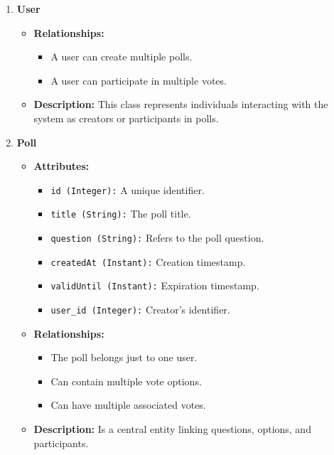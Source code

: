 \begin{enumerate}
    \item \textbf{User}
    \begin{itemize}
        \item \textbf{Relationships:}
        \begin{itemize}
            \item A user can create multiple polls.
            \item A user can participate in multiple votes.
        \end{itemize}
        \item \textbf{Description:} This class represents individuals interacting with the system as creators or participants in polls.
    \end{itemize}
    
    \item \textbf{Poll}
    \begin{itemize}
        \item \textbf{Attributes:}
        \begin{itemize}
            \item \texttt{id (Integer):} A unique identifier.
            \item \texttt{title (String):} The poll title.
            \item \texttt{question (String):} Refers to the poll question.
            \item \texttt{createdAt (Instant):} Creation timestamp.
            \item \texttt{validUntil (Instant):} Expiration timestamp.
            \item \texttt{user\_id (Integer):} Creator's identifier.
        \end{itemize}
        \item \textbf{Relationships:}
        \begin{itemize}
            \item The poll belongs just to one user.
            \item Can contain multiple vote options.
            \item Can have multiple associated votes.
        \end{itemize}
        \item \textbf{Description:} Is a central entity linking questions, options, and participants.
    \end{itemize}
    

\end{enumerate}
